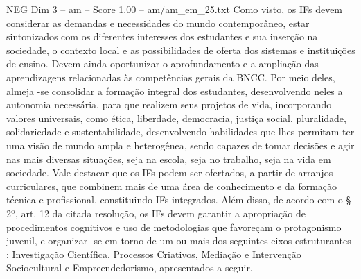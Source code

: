 \begin{textsample}{NEG Dim 3 – am – Score 1.00 – am/am\_em\_25.txt}
Como visto, os IFs devem considerar as demandas e necessidades do mundo contemporâneo, estar sintonizados com os diferentes interesses dos estudantes e sua inserção na sociedade, o contexto local e as possibilidades de oferta dos sistemas e instituições de ensino.
Devem ainda oportunizar o aprofundamento e a ampliação das aprendizagens relacionadas às competências gerais da BNCC.
Por meio deles, almeja -se consolidar a formação integral dos estudantes, desenvolvendo neles a autonomia necessária, para que realizem seus projetos de vida, incorporando valores universais, como ética, liberdade, democracia, justiça social, pluralidade, solidariedade e sustentabilidade, desenvolvendo habilidades que lhes permitam ter uma visão de mundo ampla e heterogênea, sendo capazes de tomar decisões e agir nas mais diversas situações, seja na escola, seja no trabalho, seja na vida em sociedade.
Vale destacar que os IFs podem ser ofertados, a partir de arranjos curriculares, que combinem mais de uma área de conhecimento e da formação técnica e profissional, constituindo IFs integrados.
Além disso, de acordo com o § 2º, art. 12 da citada resolução, os IFs devem garantir a apropriação de procedimentos cognitivos e uso de metodologias que favoreçam o protagonismo juvenil, e organizar -se em torno de um ou mais dos seguintes eixos estruturantes : Investigação Científica, Processos Criativos, Mediação e Intervenção Sociocultural e Empreendedorismo, apresentados a seguir.

\end{textsample}

